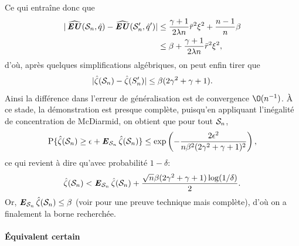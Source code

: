 Ce qui entraîne donc que
\begin{align}
  |\hEU(\S_n,\hat q) - \hEU(\S_n',\hat q')| &\leq \frac{\gamma+1}{2\lambda n}\rmax^2\xi^2 +
                                              \frac{n-1}{n}\beta\\
                                            &\leq \beta + \frac{\gamma+1}{2\lambda n}\rmax^2\xi^2,
\end{align}
d'où, après quelques simplifications algébriques, on peut enfin tirer que
\begin{equation}
  |\hat\zeta(\S_n) - \hat\zeta(S'_n)| \leq \beta(2\gamma^2 + \gamma + 1).
\end{equation}
Ainsi la différence dans l'erreur de généralisation est de convergence $\O(n^{-1})$. À ce
stade, la démonstration est presque complète, puisqu'en appliquant l'inégalité de
concentration de McDiarmid, on obtient que pour tout $\S_n$,
\begin{equation}
  \pp\{\hat\zeta(\S_n) \geq \epsilon + \E_{\S_n}\hat\zeta(\S_n)\} \leq \exp\left(-\frac{2\epsilon^2}{n\beta^2(2\gamma^2+\gamma+1)^2}\right),
\end{equation}
ce qui revient à dire qu'avec probabilité $1-\delta$:
\begin{equation}
  \hat\zeta(\S_n) < \E_{\S_n}\hat\zeta(\S_n) + \frac{\sqrt{n}\beta(2\gamma^2+\gamma+1)\log(1/\delta)}{2}.
\end{equation}
Or, $\E_{\S_n}\hat\zeta(\S_n) \leq \beta$ (voir \cite{mohri2012foundations} pour une preuve technique
mais complète), d'où on a finalement la borne recherchée.


\paragraph{Équivalent certain}

